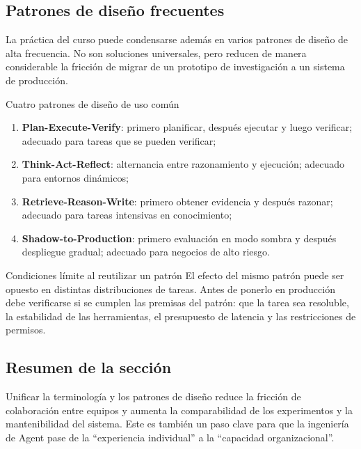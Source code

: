 \subsection{Patrones de diseño frecuentes}
La práctica del curso puede condensarse además en varios patrones de diseño de alta frecuencia. No son soluciones universales, pero reducen de manera considerable la fricción de migrar de un prototipo de investigación a un sistema de producción.

\begin{knowledgebox}{Cuatro patrones de diseño de uso común}
\begin{enumerate}
    \item \textbf{Plan-Execute-Verify}: primero planificar, después ejecutar y luego verificar; adecuado para tareas que se pueden verificar;
    \item \textbf{Think-Act-Reflect}: alternancia entre razonamiento y ejecución; adecuado para entornos dinámicos;
    \item \textbf{Retrieve-Reason-Write}: primero obtener evidencia y después razonar; adecuado para tareas intensivas en conocimiento;
    \item \textbf{Shadow-to-Production}: primero evaluación en modo sombra y después despliegue gradual; adecuado para negocios de alto riesgo.
\end{enumerate}
\end{knowledgebox}

\begin{warningbox}{Condiciones límite al reutilizar un patrón}
El efecto del mismo patrón puede ser opuesto en distintas distribuciones de tareas. Antes de ponerlo en producción debe verificarse si se cumplen las premisas del patrón: que la tarea sea resoluble, la estabilidad de las herramientas, el presupuesto de latencia y las restricciones de permisos.
\end{warningbox}

\subsection{Resumen de la sección}
Unificar la terminología y los patrones de diseño reduce la fricción de colaboración entre equipos y aumenta la comparabilidad de los experimentos y la mantenibilidad del sistema. Este es también un paso clave para que la ingeniería de Agent pase de la ``experiencia individual'' a la ``capacidad organizacional''.

